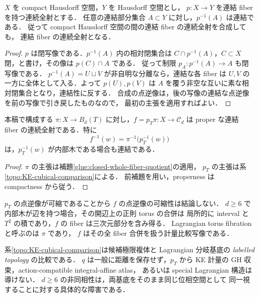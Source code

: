 \begin{lemma}
\label{topo:connected-preimages}
$X$ を compact Hausdorff 空間，$Y$ を Hausdorff 空間とし，
$p:X\to Y$ を連結 fiber を持つ連続全射とする．
任意の連結部分集合 $A\subset Y$ に対し，$p^{-1}(A)$ は連結である．
従って compact Hausdorff 空間の間の連結 fiber の連続全射を合成しても，
連結 fiber の連続全射となる．
\end{lemma}
\begin{proof}
$p$ は閉写像である．$p^{-1}(A)$ 内の相対閉集合は
$C\cap p^{-1}(A)$，$C\subset X$ 閉，と書け，その像は $p(C)\cap A$ である．
従って制限 $p_A:p^{-1}(A)\to A$ も閉写像である．
$p^{-1}(A)=U\sqcup V$ が非自明な分離なら，連結な各 fiber は
$U,V$ の一方に全体として入る．よって $p(U),p(V)$ は
$A$ を覆う非空な互いに素な相対閉集合となり，連結性に反する．
合成の点逆像は，後の写像の連結な点逆像を前の写像で引き戻したものなので，
最初の主張を適用すればよい．
\end{proof}

\begin{corollary}
\label{topo:cubical-composite-connected}
本稿で構成する $\pi:X\to B_d(T)$ に対し，$f=p_T\pi:X\to\mathcal C_d$ は
proper な連結 fiber の連続全射である．特に
\[
 f^{-1}(w)=\pi^{-1}\bigl(p_T^{-1}(w)\bigr)
\]
は，$p_T^{-1}(w)$ が内部木である場合も連結である．
\end{corollary}
\begin{proof}
$\pi$ の主張は補題\ref{glue:closed-whole-fiber-quotient}の適用，
$p_T$ の主張は系\ref{topo:KE-cubical-comparison}による．
前補題を用い，properness は compactness から従う．
\end{proof}

$p_T$ の点逆像が可縮であることから $f$ の点逆像の可縮性は結論しない．
$d\ge6$ で内部木が辺を持つ場合，その開辺上の正則 torus の合併は
局所的に interval と $T^2$ の積であり，$f$ の fiber は三次元部分を含み得る．
Lagrangian torus fibration と呼ぶのは $\pi$ であり，
$f$ はその全 fiber 合併を扱う計量比較写像である．

\begin{remark}[比較の射程]
系\ref{topo:KE-cubical-comparison}は候補極限複体と Lagrangian 分岐基底の
\emph{labelled topology} の比較である．
$q$ は一般に距離を保存せず，$p_T$ から
KE 計量の GH 収束，action-compatible integral-affine atlas，
あるいは special Lagrangian 構造は導けない．
$d\ge6$ の非同相性は，両基底をそのまま同じ位相空間として
同一視することに対する具体的な障害である．
\end{remark}



